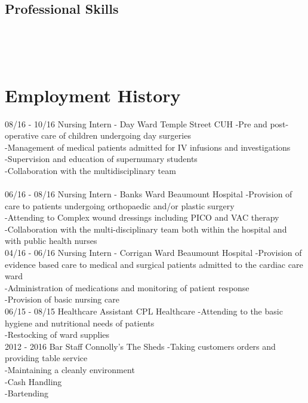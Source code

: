 \documentclass[]{friggeri-cv}
\begin{document}
\begin{aside}
\section{Professional Skills}
    ~

\end{aside}
~
\section{Employment History}
\begin{entrylist}
  \entry
    {08/16 - 10/16}
    {Nursing Intern - Day Ward}
    {Temple Street CUH}
    {-Pre and post-operative care of children undergoing day surgeries\\
-Management of medical patients admitted for IV infusions and investigations\\
-Supervision and education of supernumary students\\
-Collaboration with the multidisciplinary team\\ 
\\}
  \entry
    {06/16 - 08/16}
    {Nursing Intern - Banks Ward}
    {Beaumount Hospital}
    {-Provision of care to patients undergoing orthopaedic and/or plastic surgery\\
-Attending to Complex wound dressings including PICO and VAC therapy\\
-Collaboration with the multi-disciplinary team both within the hospital and with public health nurses
\\}
  \entry
    {04/16 - 06/16}
    {Nursing Intern - Corrigan Ward}
    {Beaumount Hospital}
    {-Provision of evidence based care to medical and surgical patients admitted to the cardiac care ward\\
-Administration of medications and monitoring of patient response\\
-Provision of basic nursing care\\}
 \entry
    {06/15 - 08/15}
    {Healthcare Assistant}
    {CPL Healthcare}
    {-Attending to the basic hygiene and nutritional needs of patients\\
-Restocking of ward supplies\\} 
    \entry
    {2012 - 2016}
    {Bar Staff}
    {Connolly's The Sheds}
    {-Taking customers orders and providing table service\\
-Maintaining a cleanly environment\\
-Cash Handling\\
-Bartending\\}
\end{entrylist}
\end{document}
